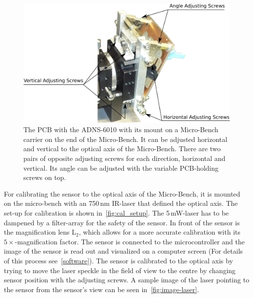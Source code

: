 \documentclass[12pt,a4paper]{article}
\begin{document}
\begin{figure}[htbp]
\begin{center}
\includegraphics[width=1\columnwidth]{figures/sens-mount.pdf}
\caption{\label{fig:sens-mount}
The PCB with the ADNS-6010 with its mount on a Micro-Bench carrier on the end of the Micro-Bench.
It can be adjusted horizontal and vertical to the optical axis of the Micro-Bench.
There are two pairs of opposite adjusting screws for each direction, horizontal and vertical.
Its angle can be adjusted with the variable PCB-holding screws on top.
}
\end{center}
\end{figure}

For calibrating the sensor to the optical axis of the Micro-Bench, it is mounted on the micro-bench with an 750\,nm IR-laser that defined the optical axis.
The set-up for calibration is shown in~\autoref{fig:cal_setup}.
The 5\,mW-laser has to be dampened by a filter-array for the safety of the sensor.
In front of the sensor is the magnification lens L$_2$, which allows for a more accurate calibration with its $5\times$-magnification factor.
The sensor is connected to the microcontroller and the image of the sensor is read out and visualized on a computer screen (For details of this process see~\autoref{software}).
The sensor is calibrated to the optical axis by trying to move the laser speckle in the field of view to the centre by changing sensor position with the adjusting screws.
A sample image of the laser pointing to the sensor from the sensor's view can be seen in~\autoref{fig:image-laser}.
\end{document}
